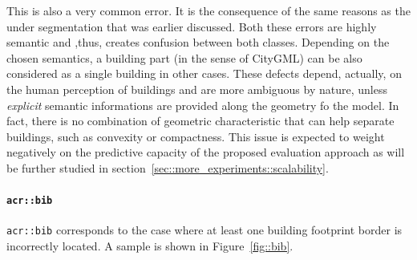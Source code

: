                 This is also a very common error.
                It is the consequence of the same reasons as the under segmentation that was earlier discussed.
                Both these errors are highly semantic and ,thus, creates confusion between both classes.
                Depending on the chosen semantics, a building part (in the sense of CityGML) can be also considered as a single building in other cases.
                These defects depend, actually, on the human perception of buildings and are more ambiguous by nature, unless \textit{explicit} semantic informations are provided along the geometry fo the model.
                In fact, there is no combination of geometric characteristic that can help separate buildings, such as convexity or compactness.
                This issue is expected to weight negatively on the predictive capacity of the proposed evaluation approach as will be further studied in section~\ref{sec::more_experiments::scalability}.

            \paragraph{\texttt{\acrlong*{acr::bib}}}
                \texttt{\gls{acr::bib}} corresponds to the case where at least one building footprint border is incorrectly located.
                A sample is shown in Figure~\ref{fig::bib}.\\

